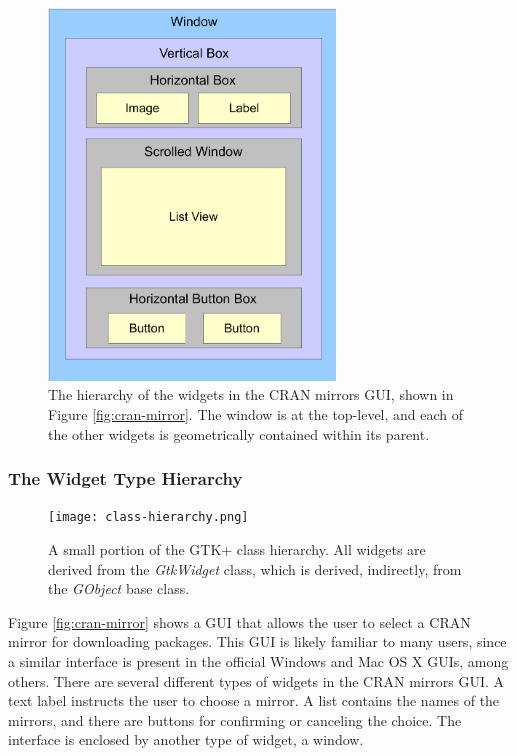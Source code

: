 \documentclass[article]{jss}
\begin{document}
\begin{figure}
\begin{center}
\includegraphics[width=3in]{widget-hierarchy.pdf}
\caption{\label{fig:widget-hierarchy}The hierarchy of the widgets in the CRAN
mirrors GUI, shown in Figure \ref{fig:cran-mirror}. The window is at the top-level,
and each of the other widgets is geometrically contained within its parent.}
\end{center}
\end{figure}

\subsubsection{The Widget Type Hierarchy}

\begin{figure}
\begin{center}
\texttt{[image: class-hierarchy.png]}
\caption{\label{fig:class-hierarchy}A small portion of the GTK+ class hierarchy. 
All widgets are derived from the \emph{GtkWidget} class, which is derived, 
indirectly, from the \emph{GObject} base class.}
\end{center}
\end{figure}

Figure \ref{fig:cran-mirror} shows a  GUI that allows the user to
select a CRAN mirror for downloading  packages.
This GUI is likely familiar to many  users, since a similar interface
is present in the official Windows and Mac OS X  GUIs, among others.
There are several different types of widgets in the CRAN mirrors GUI. A
text label instructs the user to choose a mirror.  A list contains the 
names of the mirrors, and there are buttons for confirming or canceling the choice. 
The interface is enclosed by another type of widget, a window. 
\end{document}

